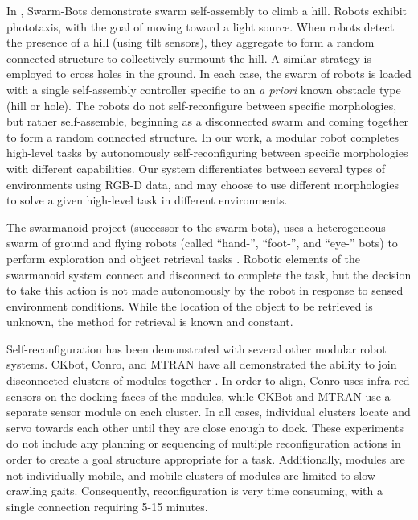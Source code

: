 \documentclass[12pt]{article}
\begin{document}
%
In \cite{o2010self}, Swarm-Bots demonstrate swarm self-assembly to climb a hill.  Robots exhibit phototaxis, with the goal of moving toward a light source.  When robots detect the presence of a hill (using tilt sensors), they aggregate to form a random connected structure to collectively surmount the hill. A similar strategy is employed to cross holes in the ground.  In each case, the swarm of robots is loaded with a single self-assembly controller specific to an \textit{a priori} known obstacle type (hill or hole).  The robots do not self-reconfigure between specific morphologies, but rather self-assemble, beginning as a disconnected swarm and coming together to form a random connected structure.  In our work, a modular robot completes high-level tasks by autonomously self-reconfiguring between specific morphologies with different capabilities.  Our system differentiates between several types of environments using RGB-D data, and may choose to use different morphologies to solve a given high-level task in different environments.    
 
The swarmanoid project (successor to the swarm-bots), uses a heterogeneous swarm of ground and flying robots (called ``hand-'', ``foot-'', and ``eye-'' bots) to perform exploration and object retrieval tasks  \cite{Dorigo2013}. Robotic elements of the swarmanoid system connect and disconnect to complete the task, but the decision to take this action is not made autonomously by the robot in response to sensed environment conditions. While the location of the object to be retrieved is unknown, the method for retrieval is known and constant.

Self-reconfiguration has been demonstrated with several other modular robot systems. CKbot, Conro, and MTRAN have all demonstrated the ability to join disconnected clusters of modules together \cite{Yim2007, Rubenstein2004,Murata2006}. In order to align, Conro uses infra-red sensors on the docking faces of the modules, while CKBot and MTRAN use a separate sensor module on each cluster.  In all cases, individual clusters locate and servo towards each other until they are close enough to dock. These experiments do not include any planning or sequencing of multiple reconfiguration actions in order to create a goal structure appropriate for a task.  Additionally,  modules are not individually mobile, and mobile clusters of modules are limited to slow crawling gaits.  Consequently, reconfiguration is very time consuming, with a single connection requiring 5-15 minutes.
\end{document}
